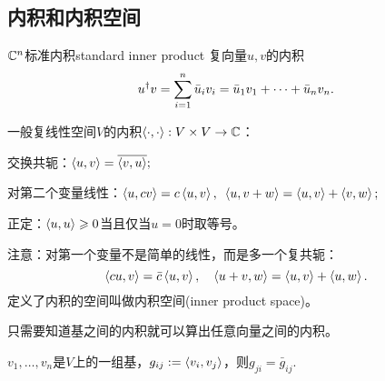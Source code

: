 \subsection{内积和内积空间}
\begin{definition}{$\mathbb C^n$标准内积}{standard inner product}
	复向量$u,v$的内积
	\[
		u^\dagger v=\sum_{i=1}^n\bar u_iv_i=\bar u_1v_1+\cdots+\bar u_nv_n.
	\]
\end{definition}
一般复线性空间$V$的内积$\left\langle \cdot,\cdot\right\rangle:V\times V\to\mathbb C$：
\begin{compactitem}
	\item 交换共轭：$\left\langle u,v\right\rangle=\overline{\left\langle v,u\right\rangle};$
	\item 对第二个变量线性：$\left\langle u,cv\right\rangle=c\left\langle u,v\right\rangle,\enspace \left\langle u,v+w\right\rangle=\left\langle u,v\right\rangle+\left\langle v,w\right\rangle;$
	\item 正定：$\left\langle u,u\right\rangle\geqslant 0$当且仅当$u=0$时取等号。
\end{compactitem}
注意：对第一个变量不是简单的线性，而是多一个复共轭：
\[
	\left\langle cu,v\right\rangle=\bar c\left\langle u,v\right\rangle,\quad \left\langle u+v,w\right\rangle=\left\langle u,v\right\rangle+\left\langle u,w\right\rangle.
\]
定义了内积的空间叫做内积空间(inner product space)。
\begin{theorem}{}{}
	只需要知道基之间的内积就可以算出任意向量之间的内积。
\end{theorem}
\prf $v_1,\ldots,v_n$是$V$上的一组基，$g_{ij}:=\left\langle v_i,v_j\right\rangle$，则$g_{ji}=\bar g_{ij}.$

